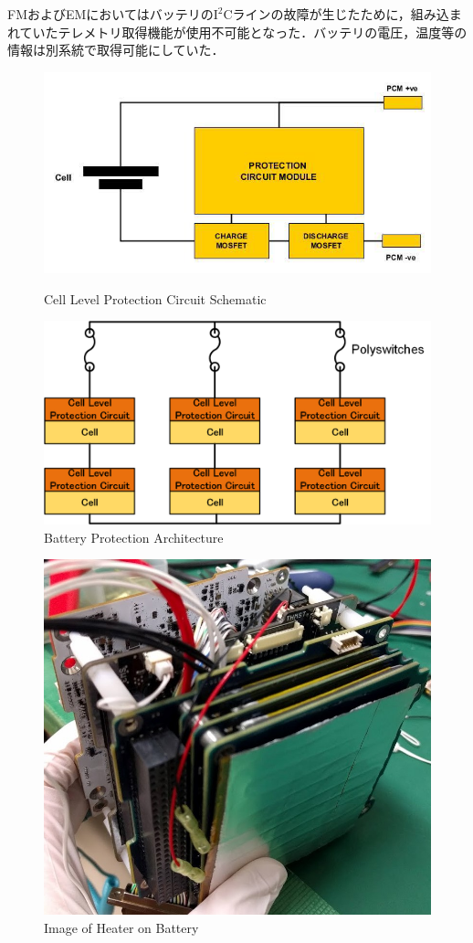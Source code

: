 FMおよびEMにおいてはバッテリの$\mathrm{I^{2}C}$ラインの故障が生じたために，組み込まれていたテレメトリ取得機能が使用不可能となった．バッテリの電圧，温度等の情報は別系統で取得可能にしていた．
\begin{figure}[htbp]
	\begin{minipage}{0.5\hsize}
		\begin{center}
			\includegraphics[height=0.5\linewidth]{./03/fig/cell_protection.png}
			\caption{Cell Level Protection Circuit Schematic \cite{bat_um}}
			\label{fig3-1bat_cpr}
		\end{center}
	\end{minipage}
	\begin{minipage}{0.5\hsize}
		\begin{center}
			\includegraphics[height=0.5\linewidth]{./03/fig/bat_pr.png}
			\caption{Battery Protection Architecture}
			\label{fig3-1bat_pr}
		\end{center}
	\end{minipage}
\end{figure}

\begin{figure}[htbp]
	\begin{center}
		\includegraphics[width=0.5\linewidth]{./03/fig/heater.jpg}
		\caption{Image of Heater on Battery}
		\label{fig3-1heater}
	\end{center}
\end{figure}
